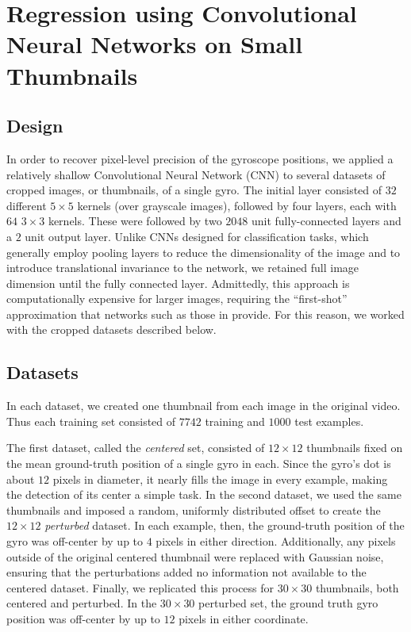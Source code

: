 \documentclass[twocolumn, 10pt]{asme2ej}
\begin{document}
\section{Regression using Convolutional Neural Networks on Small Thumbnails}
\label{sec:conv-regr}

\subsection{Design}
\label{sec:design}

In order to recover pixel-level precision of the gyroscope positions, we applied
a relatively shallow Convolutional Neural Network (CNN)
\cite{krizhevsky_imagenet_2012} to several datasets of cropped images, or
thumbnails, of a single gyro. The initial layer consisted of $32$ different
$5 \times 5$ kernels (over grayscale images), followed by four layers, each with
$64$ $3 \times 3$ kernels. These were followed by two $2048$ unit
fully-connected layers and a $2$ unit output layer. Unlike CNNs designed for
classification tasks, which generally employ pooling layers to reduce the
dimensionality of the image and to introduce translational invariance to the
network, we retained full image dimension until the fully connected
layer. Admittedly, this approach is computationally expensive for larger images,
requiring the ``first-shot'' approximation that networks such as those in
\cite{huang_speed/accuracy_2016} provide. For this reason, we worked with the
cropped datasets described below.

\subsection{Datasets}
\label{sec:datasets}

In each dataset, we created one thumbnail from each image in the original
video. Thus each training set consisted of $7742$ training and $1000$ test
examples.

The first dataset, called the \emph{centered} set, consisted of $12 \times 12$
thumbnails fixed on the mean ground-truth position of a single gyro in
each. Since the gyro's dot is about $12$ pixels in diameter, it nearly fills the
image in every example, making the detection of its center a simple task. In the
second dataset, we used the same thumbnails and imposed a random, uniformly
distributed offset to create the $12 \times 12$ \emph{perturbed} dataset. In
each example, then, the ground-truth position of the gyro was off-center by up
to $4$ pixels in either direction. Additionally, any pixels outside of the
original centered thumbnail were replaced with Gaussian noise, ensuring that the
perturbations added no information not available to the centered
dataset. Finally, we replicated this process for $30 \times 30$ thumbnails, both
centered and perturbed. In the $30\times 30$ perturbed set, the ground truth
gyro position was off-center by up to $12$ pixels in either coordinate.
\end{document}
